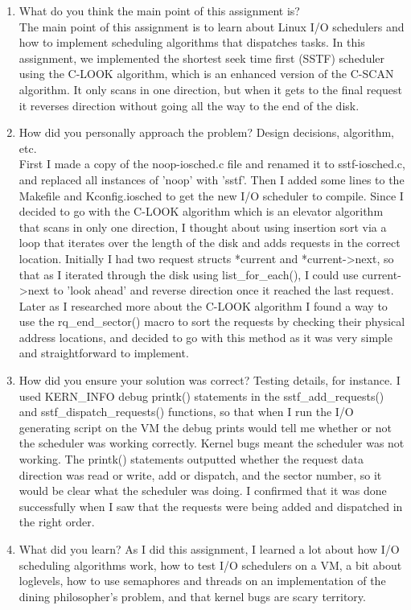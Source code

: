 \documentclass[letterpaper,10pt]{article}
\begin{document}
\begin{enumerate}
  \item{What do you think the main point of this assignment is?}\\
	The main point of this assignment is to learn about Linux I/O schedulers and how to implement scheduling algorithms that dispatches tasks. In this assignment, we implemented the shortest seek time first (SSTF) scheduler using the C-LOOK algorithm, which is an enhanced version of the C-SCAN algorithm. It only scans in one direction, but when it gets to the final request it reverses direction without going all the way to the end of the disk.
  
  \item{How did you personally approach the problem? Design decisions, algorithm, etc.}\\
	First I made a copy of the noop-iosched.c file and renamed it to sstf-iosched.c, and replaced all instances of 'noop' with 'sstf'. Then I added some lines to the Makefile and Kconfig.iosched to get the new I/O scheduler to compile. 
	Since I decided to go with the C-LOOK algorithm which is an elevator algorithm that scans in only one direction, I thought about using insertion sort via a loop that iterates over the length of the disk and adds requests in the correct location. Initially I had two request structs *current and *current->next, so that as I iterated through the disk using list\_for\_each(), I could use current->next to 'look ahead' and reverse direction once it reached the last request. Later as I researched more about the C-LOOK algorithm I found a way to use the rq\_end\_sector() macro to sort the requests by checking their physical address locations, and decided to go with this method as it was very simple and straightforward to implement.

  
  \item{How did you ensure your solution was correct? Testing details, for instance.}
	I used KERN\_INFO debug printk() statements in the sstf\_add\_requests() and sstf\_dispatch\_requests() functions, so that when I run the I/O generating script on the VM the debug prints would tell me whether or not the scheduler was working correctly. Kernel bugs meant the scheduler was not working. The printk() statements outputted whether the request data direction was read or write, add or dispatch, and the sector number, so it would be clear what the scheduler was doing. I confirmed that it was done successfully when I saw that the requests were being added and dispatched in the right order.
  
  \item{What did you learn?}
  	As I did this assignment, I learned a lot about how I/O scheduling algorithms work, how to test I/O schedulers on a VM, a bit about loglevels, how to use semaphores and threads on an implementation of the dining philosopher's problem, and that kernel bugs are scary territory.
  
\end{enumerate}
\end{document}
